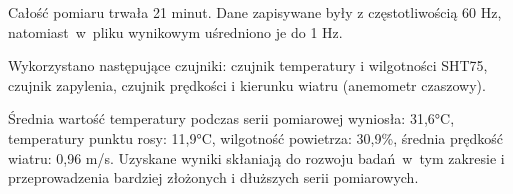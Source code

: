 \documentclass[\main/boa.tex]{subfiles}
\begin{document}
Całość pomiaru trwała 21 minut. Dane zapisywane były z częstotliwością 60 Hz, natomiast~w~pliku wynikowym uśredniono je do 1 Hz. 

Wykorzystano następujące czujniki: czujnik temperatury i wilgotności SHT75, czujnik zapylenia, czujnik prędkości i kierunku wiatru (anemometr czaszowy). 

Średnia wartość temperatury podczas serii pomiarowej wyniosła: 31,6°C, temperatury punktu rosy: 11,9°C, wilgotność powietrza: 30,9\%, średnia prędkość wiatru: 0,96 m/s. 
Uzyskane wyniki skłaniają do rozwoju badań~w~tym zakresie i przeprowadzenia bardziej złożonych i dłuższych serii pomiarowych. 
\end{document}
